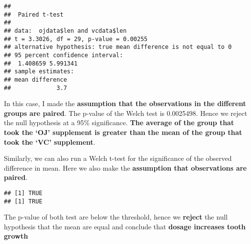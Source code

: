 \documentclass[
]{article}
\newenvironment{Shaded}{\begin{snugshade}}{\end{snugshade}}
\newcommand{\AttributeTok}[1]{\textcolor[rgb]{0.13,0.29,0.53}{#1}}
\newcommand{\ConstantTok}[1]{\textcolor[rgb]{0.56,0.35,0.01}{#1}}
\newcommand{\DecValTok}[1]{\textcolor[rgb]{0.00,0.00,0.81}{#1}}
\newcommand{\FloatTok}[1]{\textcolor[rgb]{0.00,0.00,0.81}{#1}}
\newcommand{\FunctionTok}[1]{\textcolor[rgb]{0.13,0.29,0.53}{\textbf{#1}}}
\newcommand{\NormalTok}[1]{#1}
\newcommand{\OtherTok}[1]{\textcolor[rgb]{0.56,0.35,0.01}{#1}}
\newcommand{\SpecialCharTok}[1]{\textcolor[rgb]{0.81,0.36,0.00}{\textbf{#1}}}
\begin{document}
\begin{verbatim}
## 
##  Paired t-test
## 
## data:  ojdata$len and vcdata$len
## t = 3.3026, df = 29, p-value = 0.00255
## alternative hypothesis: true mean difference is not equal to 0
## 95 percent confidence interval:
##  1.408659 5.991341
## sample estimates:
## mean difference 
##             3.7
\end{verbatim}

In this case, I made the \textbf{assumption that the observations in the
different groups are paired}. The p-value of the Welch test is
0.0025498. Hence we reject the null hypothesis at a 95\% significance.
\textbf{The average of the group that took the `OJ' supplement is
greater than the mean of the group that took the `VC' supplement}.

Similarly, we can also run a Welch t-test for the significance of the
observed difference in mean. Here we also make the \textbf{assumption
that observations are paired}.

\begin{Shaded}
\end{Shaded}

\begin{verbatim}
## [1] TRUE
## [1] TRUE
\end{verbatim}

The p-value of both test are below the threshold, hence we
\textbf{reject} the null hypothesis that the mean are equal and conclude
that \textbf{dosage increases tooth growth}
\end{document}
